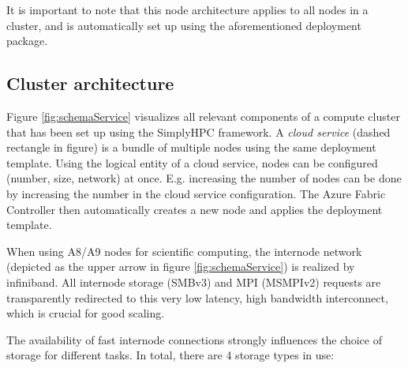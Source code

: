 \documentclass[3p,times]{elsarticle}
\begin{document}
It is important to note that this node architecture applies to all nodes in a cluster, and is automatically set up using the aforementioned deployment package. 


\subsection{Cluster architecture}

Figure \ref{fig:schemaService} visualizes all relevant components of a compute cluster that has been set up using the SimplyHPC framework. 
A \textit{cloud service} (dashed rectangle in figure) is a bundle of multiple nodes using the same deployment template. Using the logical entity of a cloud service, nodes can be configured (number, size, network) at once. E.g. increasing the number of nodes can be done by increasing the number in the cloud service configuration. The Azure Fabric Controller then automatically creates a new node and applies the deployment template.

When using A8/A9 nodes for scientific computing, the internode network (depicted as the upper arrow in figure \ref{fig:schemaService}) is realized by infiniband. All internode storage (SMBv3) and MPI (MSMPIv2) requests are transparently redirected to this very low latency, high bandwidth interconnect, which is crucial for good scaling.

The availability of fast internode connections strongly influences the choice of storage for different tasks. In total, there are 4 storage types in use:
\end{document}
